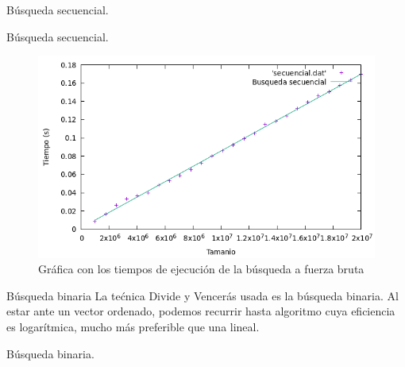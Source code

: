 \documentclass[10pt, xcolor=table]{beamer}
\begin{document}
\begin{frame}[fragile]{Búsqueda secuencial. }
	\begin{table}[h!]
		\centering
		\footnotesize
		\caption{Experiencia empírica de la búsqueda a fuerza bruta}
	\end{table}
\end{frame}


\begin{frame}[fragile]{Búsqueda secuencial. }
\begin{figure}[h!]
	\centering
	\includegraphics[scale=0.45]{./Images/Grafica_secuencial.png}
	\caption{Gráfica con los tiempos de ejecución de la búsqueda a fuerza bruta}
\end{figure}
\end{frame}

\begin{frame}[fragile]{Búsqueda binaria}
La tećnica Divide y Vencerás usada es la búsqueda binaria. Al estar ante un vector ordenado, podemos recurrir hasta algoritmo cuya eficiencia es logarítmica, mucho más preferible que una lineal.
\end{frame}

\begin{frame}[fragile]{Búsqueda binaria. }

\end{frame}
\end{document}
